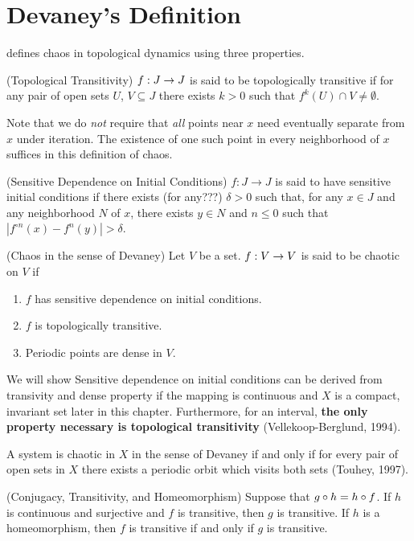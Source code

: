 \documentclass[12pt,draft,twoside]{book}
\begin{document}
\chapter{Devaney's Definition}
\citet{devaney} defines chaos in topological dynamics using three properties.

\begin{definition}
  (Topological Transitivity) 
  $f: J \rightarrow J$ is said to be topologically transitive if for any pair of open sets $U$, $V \subseteq J$ there exists $k > 0$ such that $f^k(U) \cap V \neq \emptyset$.
  \label{defn:transitivity}
\end{definition}

Note that we do \textit{not} require that \textit{all} points near $x$ need eventually separate from $x$ under iteration.
The existence of one such point in every neighborhood of $x$ suffices in this definition of chaos.

\begin{definition}
  (Sensitive Dependence on Initial Conditions) 
  $f: J \rightarrow J$ is said to have sensitive initial conditions if there exists (for any???) $\delta > 0$
  such that, for any $x \in J$ and any neighborhood $N$ of $x$,
  there exists $y\in N$ and $n\leq 0$ such that $|f^{\circ n}(x) - f^n(y)|>\delta$.
  \label{defn:sdic}
\end{definition}

\begin{definition}
  (Chaos in the sense of Devaney) 
  Let $V$ be a set.
  $f: V\rightarrow V$ is said to be chaotic on $V$ if
  \begin{enumerate}
    \item $f$ has sensitive dependence on initial conditions.
    \item $f$ is topologically transitive.
    \item Periodic points are dense in $V$.
  \end{enumerate}
\end{definition}


We will show Sensitive dependence on initial conditions can be derived from transivity and dense property if the mapping is continuous and $X$ is a compact, invariant set later in this chapter. \citep{banks}
Furthermore, for an interval, \textbf{the only property necessary is
topological transitivity} (Vellekoop-Berglund, 1994).

A system is chaotic in $X$ in the sense of Devaney if and only if
for every pair of open sets in $X$ there exists a periodic orbit 
which visits both sets (Touhey, 1997).


\begin{proposition}
  (Conjugacy, Transitivity, and Homeomorphism) 
  Suppose that $g \circ h = h \circ f$. If $h$ is continuous and
  surjective and $f$ is transitive, then $g$ is transitive.
  If $h$ is a homeomorphism, then $f$ is transitive if and only if
  $g$ is transitive.
\end{proposition}




\printindex
\end{document}
